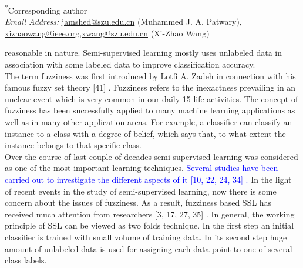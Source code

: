 \documentclass{article}
\begin{document}
	\noindent	%
	\makebox[0.4\linewidth][l]{\hrulefill}

	\hspace{0.1cm} \small{\textsuperscript{*}Corresponding author}\\
	\hspace{1cm}\textit{Email Address: }\href{URL}{jamshed@szu.edu.cn} (Muhammed J. A. Patwary),\href{URL}{ xizhaowang@ieee.org,xwang@szu.edu.cn} (Xi-Zhao Wang)
	
	\normalsize
	\newpage
	reasonable in nature. Semi-supervised learning mostly uses unlabeled data in association with some labeled data to improve classification accuracy.\\
	
	The term fuzziness was first introduced by Lotfi A. Zadeh in connection with his famous fuzzy set theory
	[41] \cite{kosko1990fuzziness}. Fuzziness refers to the inexactness prevailing in an unclear event which is very common in our daily
	15 life activities. The concept of fuzziness has been successfully applied to many machine learning applications
	as well as in many other application areas. For example, a classifier can classify an instance to a class with
	a degree of belief, which says that, to what extent the instance belongs to that specific class.\\
	
	Over the course of last couple of decades semi-supervised learning was considered as one of the most
	important learning techniques. \textcolor{blue}{Several studies have been carried out to investigate the different aspects of it [10, 22, 24, 34] \cite{higashi1982measures, hampton1998similarity, gentili2018fuzziness, klir1987we}. }In the light of recent events in the study of semi-supervised learning, now there is some
	concern about the issues of fuzziness. As a result, fuzziness based SSL has received much attention from
	researchers \cite{bezdek1994fuzziness,montero2007role,wang2009mathematics,zhang1998fuzziness} [3, 17, 27, 35] \cite{kosko1990fuzziness, saaty1974measuring, wang2009mathematics, kacprzyk2012consensus}. In general, the working principle of SSL can be viewed as two folds technique.
	In the first step an initial classifier is trained with small volume of training data. In its second step huge
	amount of unlabeled data is used for assigning each data-point to one of several class labels.\\
	
\end{document}
